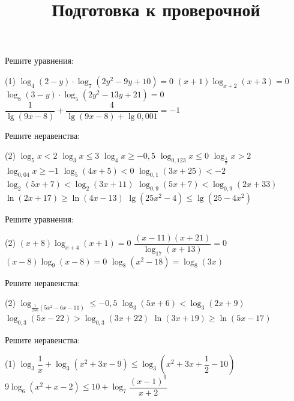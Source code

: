 \begin{class}[number=6]
	\begin{listofex}
		\item Решите уравнения: %
		\begin{tasks}(1)
			\task \( \log_4 (2-y) \cdot \log_7 (2y^2-9y+10) = 0 \)
			\task \( (x+1)\log_{x+2}(x+3)=0 \)
			\task \( \log_8 (3-y) \cdot \log_5 (2y^2-13y+21)=0 \)
			\task \( \dfrac{ 1 }{ \lg (9x-8) } + \dfrac{ 4 }{ \lg (9x-8) + \lg 0,001 } = -1 \)
		\end{tasks}
		\item Решите неравенства: %
		\begin{tasks}(2)
			\task \( \log_5 x<2 \)
			\task \( \log_3 x \le 3 \)
			\task \( \log_4 x \ge -0,5 \)
			\task \( \log_{0,123} x \le 0 \)
			\task \( \log_{\tfrac{1}{7}}x>2 \)
			\task \( \log_{0,04}x \ge -1 \)
			\task \( \log_5 (4x+5) < 0 \)
			\task \( \log_{0,1} (3x+25) < -2 \)
			\task \( \log_2(5x+7) < \log_2 (3x+11) \)
			\task \( \log_{0,9}(5x+7) < \log_{0,9} (2x+33) \)
			\task \( \ln(2x+17) \ge \ln(4x-13) \)
			\task \( \lg(25x^2-4) \le \lg(25-4x^2) \)
		\end{tasks}
	\end{listofex}
\end{class}

\begin{homework}[number=3]
	\begin{listofex}
		\item Решите уравнения: %
		\begin{tasks}(2)
			\task \( (x+8)\log_{x+4}(x+1)=0 \)
			\task \( \dfrac{ (x-11)(x+21) }{ \log_{17}(x+13) }=0 \)
			\task \( (x-8)\log_9(x-8)=0 \)
			\task \( \log_8(x^2-18)=\log_8(3x) \)
		\end{tasks}
		\item Решите неравенства: %
		\begin{tasks}(2)
			\task \( \log_{\tfrac{1}{256}(5x^2-6x-11)} \le -0,5 \)
			\task \( \log_3 (5x+6) < \log_3 (2x+9) \)
			\task \( \log_{0,3}(5x-22) > \log_{0,3}(3x+22) \)
			\task \( \ln(3x+19)\ge \ln(5x-17) \)
		\end{tasks}
	\end{listofex}
\end{homework}

\begin{class}[number=7]
	\title{Подготовка к проверочной}
	\begin{listofex}
		\item Решите неравенства:
	\begin{tasks}(1)
		\task \( \log_3 \dfrac{1}{x} + \log_3 (x^2+3x-9) \le \log_3 \left( x^2+3x+\dfrac{1}{2}-10 \right)  \)
		\task \( 9\log_6 (x^2+x-2) \le 10 + \log_7 \dfrac{(x-1)^9}{x+2} \)
	\end{tasks}
	\end{listofex}
\end{class}

